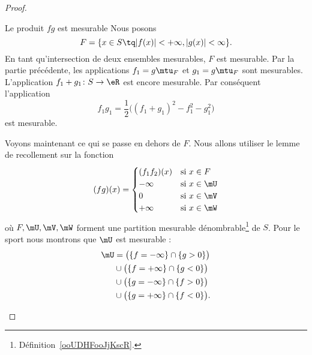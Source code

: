 \begin{proof}
\begin{subproof}
\begin{subproof}
        \item[Le produit \( fg\) est mesurable]
            Nous posons
            \begin{equation}
                F=\{ x\in S\tq | f(x) |<+\infty,| g(x) |<\infty \}.
            \end{equation}
            En tant qu'intersection de deux ensembles mesurables, \( F\) est mesurable. Par la partie précédente, les applications \( f_1=g\mtu_F\) et \( g_1=g\mtu_F\) sont mesurables. L'application \( f_1+g_1\colon S\to \eR\) est encore mesurable. Par conséquent l'application
            \begin{equation}
                f_1g_1=\frac{ 1 }{2}\big( (f_1+g_1)^2-f_1^2-g_1^2 \big)
            \end{equation}
            est mesurable.

            Voyons maintenant ce qui se passe en dehors de \( F\). Nous allons utiliser le lemme de recollement sur la fonction
            \begin{equation}
                (fg)(x)=\begin{cases}
                    (f_1f_2)(x) & \text{si } x\in F         \\
                    -\infty     & \text{si } x\in\mU        \\
                    0           & \text{si } x\in \mV       \\
                    +\infty     & \text{si } x\in\mW
                \end{cases}
            \end{equation}
            où \( F,\mU,\mV,\mW\) forment une partition mesurable dénombrable\footnote{Définition~\ref{ooUDHFooJjKscR}.} de \( S\). Pour le sport nous montrons que \( \mU\) est mesurable :
            \begin{subequations}
                \begin{align}
                    \mU & =\big( \{ f=-\infty \}\cap\{ g>0 \} \big)     \\
                        & \cup\big( \{ f=+\infty \}\cap\{ g<0 \} \big)  \\
                        & \cup\big( \{ g=-\infty \}\cap\{ f>0 \} \big)  \\
                        & \cup\big( \{ g=+\infty \}\cap\{ f<0 \}\big).
                \end{align}
            \end{subequations}
        \end{subproof}
    \end{subproof}
\end{proof}

